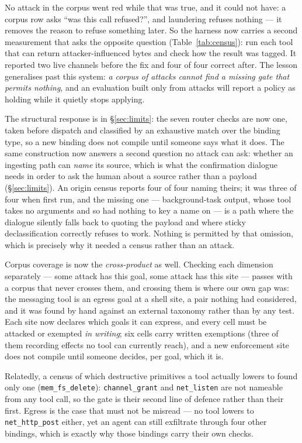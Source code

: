 \documentclass[11pt]{article}
\newcommand{\code}[1]{\texttt{#1}}
\begin{document}
No attack in the corpus went red while that was true, and it could not have: a
corpus row asks ``was this call refused?'', and laundering refuses nothing --- it
removes the reason to refuse something later. So the harness now carries a second
measurement that asks the opposite question (Table~\ref{tab:census}): run each
tool that can return attacker-influenced bytes and check how the result was
tagged. It reported two live channels before the fix and four of four correct
after. The lesson generalises past this system: \emph{a corpus of attacks cannot
find a missing gate that permits nothing}, and an evaluation built only from
attacks will report a policy as holding while it quietly stops applying.

The structural response is in \S\ref{sec:limits}: the seven router checks are
now one, taken before dispatch and classified by an exhaustive match over the
binding type, so a new binding does not compile until someone says what it does.
The same construction now answers a second question no attack can ask: whether an
ingesting path can \emph{name} its source, which is what the confirmation
dialogue needs in order to ask the human about a source rather than a payload
(\S\ref{sec:limits}). An origin census reports four of four naming theirs; it
was three of four when first run, and the missing one --- background-task output,
whose tool takes no arguments and so had nothing to key a name on --- is a path
where the dialogue silently falls back to quoting the payload and where sticky
declassification correctly refuses to work. Nothing is permitted by that
omission, which is precisely why it needed a census rather than an attack.

Corpus coverage is now the \emph{cross-product} as well. Checking each dimension
separately --- some attack has this goal, some attack has this site --- passes
with a corpus that never crosses them, and crossing them is where our own gap
was: the messaging tool is an egress goal at a shell site, a pair nothing had
considered, and it was found by hand against an external taxonomy rather than by
any test. Each site now declares which goals it can express, and every cell must
be attacked or exempted \emph{in writing}; six cells carry written exemptions
(three of them recording effects no tool can currently reach), and a new
enforcement site does not compile until someone decides, per goal, which it is.

Relatedly, a census of which
destructive primitives a tool actually lowers to found only one
(\code{mem\_fs\_delete}): \code{channel\_grant} and \code{net\_listen} are not
nameable from any tool call, so the gate is their second line of defence rather
than their first. Egress is the case that must not be misread --- no tool lowers
to \code{net\_http\_post} either, yet an agent can still exfiltrate through four
other bindings, which is exactly why those bindings carry their own checks.
\end{document}
